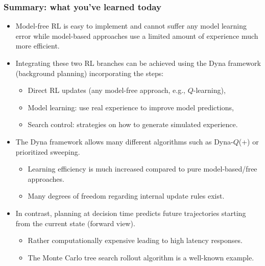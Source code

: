 \begin{frame}
	\frametitle{Summary: what you've learned today}
	\begin{itemize}
		\item Model-free RL is easy to implement and cannot suffer any model learning error while model-based approaches use a limited amount of experience much more efficient. \pause
		\item Integrating these two RL branches can be achieved using the Dyna framework (background planning) incorporating the steps:
		      \begin{itemize}
			      \item Direct RL updates (any model-free approach, e.g., $Q$-learning),
			      \item Model learning: use real experience to improve model predictions,
			      \item Search control: strategies on how to generate simulated experience. \pause
		      \end{itemize}
		\item The Dyna framework allows many different algorithms such as Dyna-$Q$(+) or prioritized sweeping.
		      \begin{itemize}
			      \item Learning efficiency is much increased compared to pure model-based/free approaches.
			      \item Many degrees of freedom regarding internal update rules exist.\pause
		      \end{itemize}
		\item In contrast, planning at decision time predicts future trajectories starting from the current state (forward view).
		      \begin{itemize}
			      \item Rather computationally expensive leading to high latency responses.
			      \item The Monte Carlo tree search rollout algorithm is a well-known example.
		      \end{itemize}
	\end{itemize}
\end{frame}